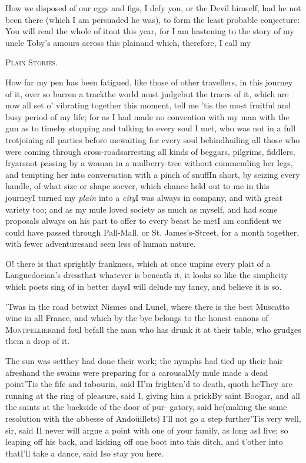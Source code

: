 \documentclass{article}
\begin{document}
\tsh How we disposed of our eggs and figs, I defy you,
or the Devil himself, had he not been there (which I am persuaded
he was), to form the least probable conjecture: You will read the
whole of it\break\tsh not this year, for I am hastening to the
story of my uncle Toby’s amours\break
{}
 across this plain\tsk and which, therefore, I call
my

\centerline{\textsc{Plain Stories}.}

\smallskip

How far my pen has been fatigued, like those of other
travellers, in this journey of it, over so barren a track\tsk the
world must judge\tsk but the traces of it, which are now all set
o’ vibrating together this moment, tell me ’tis the
most fruitful and busy period of my life; for as I had made no
convention with my man with the gun as to time\tsk by stopping
and talking to every soul I met, who was not in a full
trot\tsk joining all parties before me\tsk waiting for every
soul behind\tsk hailing all those who were coming through
cross-roads\tsk arresting all kinds of beggars, pilgrims,
fiddlers, fryars\tsk not passing by a woman in a
mulberry-tree
without commending her legs, and tempting her into conversation
with a pinch of snuff\tsh In short, by seizing every
handle, of what size or shape soever, which chance held out to me
in this journey\tsk I turned my \textit{plain} into a
\textit{city}\tsk I was always in company, and with great variety too; and
as my mule loved society as much as myself, and had some proposals
always on his part to offer to every beast he met\tsk I am
confident we could have passed through Pall-Mall, or St.\@
James’s-Street, for a month together, with fewer
adventures\tsk and seen less of human nature.

O! there is that sprightly frankness, which at once unpins every
plait of a Languedocian’s dress\tsk that whatever is
beneath it, it looks so like the simplicity which poets sing of in
better days\tsk I will delude my fancy, and believe it is so.

’Twas in the road betwixt Nismes and Lunel,
where there is the best Muscatto wine in all France,
and which by the bye belongs to the honest canons of
\textsc{Montpellier}\tsk and foul befall the man who has
drunk it at their table, who grudges them a drop of it.

\tsh The sun was set\tsk they had done their work;
the nymphs had tied up their hair afresh\tsk and the swains were
preparing for a carousal\tsk My mule made a dead point\tsh ’Tis the fife
and tabourin, said I\tsh I’m frighten’d to
death, quoth he\tsh They are running at the ring of
pleasure, said I, giving him a prick\tsh By saint
Boogar, and all the saints at the backside of the door of
pur- gatory, said he\tsk (making the same resolution with the
abbesse of Andoüillets) I’ll not go a step
further\tsh ’Tis very well, sir, said
I\tsh I never will argue a point with one of your family,
as long as\break I live; so leaping off his back, and kicking off one
boot into this ditch, and t’other into that\tsk I’ll
take a dance, said I\tsk so stay you here.
\end{document}
